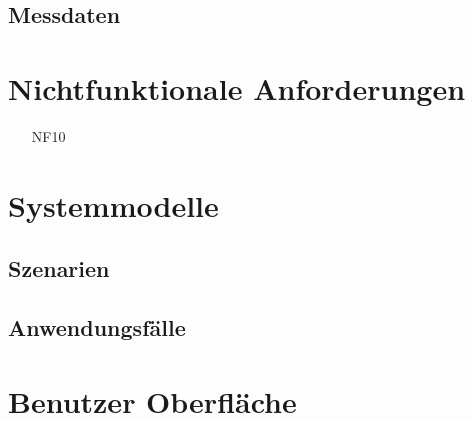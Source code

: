 \documentclass[a4paper,12pt]{article}
\begin{document}
\subsection{Messdaten}

\section{Nichtfunktionale Anforderungen}
\begin{itemize}[nosep]
\item[NF10]
\end{itemize}

\section{Systemmodelle}

\subsection{Szenarien}

\subsection{Anwendungsfälle}











\section{Benutzer Oberfläche}
\end{document}
